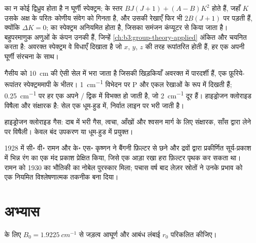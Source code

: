  का न कोई द्विध्रुव होता है न घूर्णी स्पेक्ट्रम;  के
स्तर $BJ(J+1) + (A - B)K^2$ होते हैं, जहाँ $K$ उसके अक्ष के परितः कोणीय संवेग को गिनता है,
और उसकी रेखाएँ फिर भी $2B(J+1)$ पर पड़ती हैं, क्योंकि $\Delta K = 0$;  का
स्पेक्ट्रम अनियमित होता है, जिसका समंजन कंप्यूटर से किया जाता है। बहुपरमाणुक
अणुओं के कंपन उनकी  हैं, जिन्हें
\cref{ch:b3:group-theory-applied} अंकित और चयनित करता है: अवरक्त स्पेक्ट्रम वे विधाएँ दिखाता है
जो $x$, $y$, $z$ की तरह रूपांतरित होती हैं, हर एक अपनी घूर्णी संरचना के साथ।

\begin{inthelab}
गैसीय  को \qty{10}{cm} की ऐसी सेल में भरा जाता है जिसकी खिड़कियाँ
अवरक्त में पारदर्शी हैं, एक फ़ूरिये-रूपांतर स्पेक्ट्रममापी के भीतर। \qty{1}{cm^{-1}}
विभेदन पर P और  एकल रेखाओं के रूप में दिखती हैं; \qty{0.25}{cm^{-1}} पर हर एक
अपने / द्विक में विभक्त हो जाती है, जो \qty{2}{cm^{-1}} दूर हैं। हाइड्रोजन
क्लोराइड विषैला और संक्षारक है: सेल एक धूम-हुड में, निर्वात लाइन पर
भरी जाती है।
\end{inthelab}

\begin{safety}{}
हाइड्रोजन क्लोराइड गैस: दाब में भरी गैस, त्वचा, आँखों और
श्वसन मार्ग के लिए संक्षारक, साँस द्वारा लेने पर विषैली। केवल बंद उपकरण या
धूम-हुड में प्रयुक्त।
\end{safety}

\begin{history}[रामन, 1928]
1928 में सी॰ वी॰ रामन और के॰ एस॰ कृष्णन ने बैंगनी फ़िल्टर से छने और द्रवों
द्वारा प्रकीर्णित सूर्य-प्रकाश में भिन्न रंग का एक मंद प्रकाश प्रेक्षित किया,
जिसे एक आड़ा रखा हरा फ़िल्टर पृथक कर सकता था। रामन को 1930 का भौतिकी का नोबेल
पुरस्कार मिला; पचास वर्ष बाद लेज़र स्रोतों ने उनके प्रभाव को एक नियमित विश्लेषणात्मक
तकनीक बना दिया।
\end{history}

\section{अभ्यास}

\begin{exercise}[$\star$]\label{exo:b3:rovibrational-spectroscopy:1}
 के लिए $B_0 = \qty{1.9225}{cm^{-1}}$ से जड़त्व आघूर्ण
और आबंध लंबाई $r_0$ परिकलित कीजिए।
\end{exercise}

